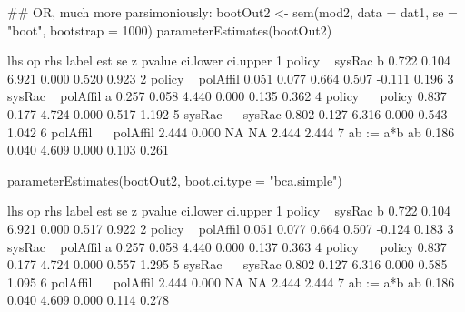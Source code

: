 \begin{Schunk}
\begin{Sinput}
 ## OR, much more parsimoniously:
 bootOut2 <- sem(mod2, data = dat1, se = "boot", bootstrap = 1000)
 parameterEstimates(bootOut2)
\end{Sinput}
\begin{Soutput}
       lhs op      rhs label   est    se     z pvalue ci.lower ci.upper
1   policy  ~   sysRac     b 0.722 0.104 6.921  0.000    0.520    0.923
2   policy  ~ polAffil       0.051 0.077 0.664  0.507   -0.111    0.196
3   sysRac  ~ polAffil     a 0.257 0.058 4.440  0.000    0.135    0.362
4   policy ~~   policy       0.837 0.177 4.724  0.000    0.517    1.192
5   sysRac ~~   sysRac       0.802 0.127 6.316  0.000    0.543    1.042
6 polAffil ~~ polAffil       2.444 0.000    NA     NA    2.444    2.444
7       ab :=      a*b    ab 0.186 0.040 4.609  0.000    0.103    0.261
\end{Soutput}
\begin{Sinput}
 parameterEstimates(bootOut2, boot.ci.type = "bca.simple")
\end{Sinput}
\begin{Soutput}
       lhs op      rhs label   est    se     z pvalue ci.lower ci.upper
1   policy  ~   sysRac     b 0.722 0.104 6.921  0.000    0.517    0.922
2   policy  ~ polAffil       0.051 0.077 0.664  0.507   -0.124    0.183
3   sysRac  ~ polAffil     a 0.257 0.058 4.440  0.000    0.137    0.363
4   policy ~~   policy       0.837 0.177 4.724  0.000    0.557    1.295
5   sysRac ~~   sysRac       0.802 0.127 6.316  0.000    0.585    1.095
6 polAffil ~~ polAffil       2.444 0.000    NA     NA    2.444    2.444
7       ab :=      a*b    ab 0.186 0.040 4.609  0.000    0.114    0.278
\end{Soutput}
\end{Schunk}
